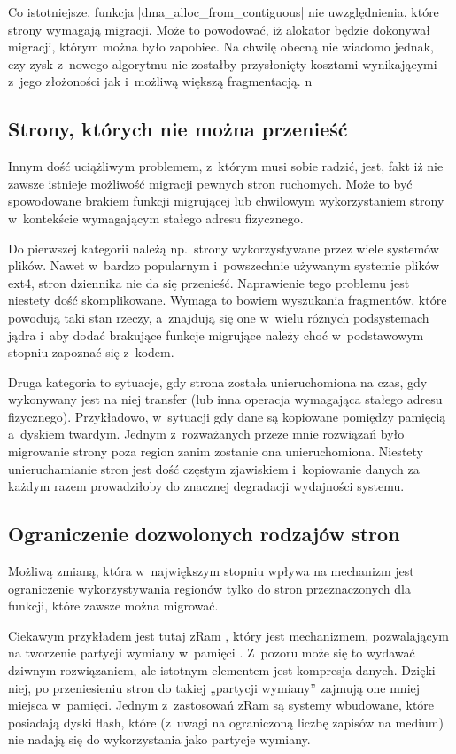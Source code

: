 Co istotniejsze, funkcja \code|dma_alloc_from_contiguous| nie
uwzględnienia, które strony wymagają migracji.  Może to powodować, iż
alokator będzie dokonywał migracji, którym można było zapobiec.  Na
chwilę obecną nie wiadomo jednak, czy zysk z~nowego algorytmu nie
zostałby przysłonięty kosztami wynikającymi z~jego złożoności jak
i~możliwą większą fragmentacją.
n
\subsection{Strony, których nie można przenieść}

Innym dość uciążliwym problemem, z~którym  musi sobie radzić, jest,
fakt iż nie zawsze istnieje możliwość migracji pewnych stron
ruchomych.  Może to być spowodowane brakiem funkcji migrującej lub
chwilowym wykorzystaniem strony w~kontekście wymagającym stałego
adresu fizycznego.

Do pierwszej kategorii należą np.\ strony wykorzystywane przez wiele
systemów plików.  Nawet w~bardzo popularnym i~powszechnie używanym
systemie plików ext4, stron dziennika nie da się przenieść.
Naprawienie tego problemu jest niestety dość skomplikowane.  Wymaga to
bowiem wyszukania fragmentów, które powodują taki stan rzeczy,
a~znajdują się one w~wielu różnych podsystemach jądra i~aby dodać
brakujące funkcje migrujące należy choć w~podstawowym stopniu zapoznać
się z~kodem.

Druga kategoria to sytuacje, gdy strona została unieruchomiona na
czas, gdy wykonywany jest na niej transfer  (lub inna operacja
wymagająca stałego adresu fizycznego).  Przykładowo, w~sytuacji gdy
dane są kopiowane pomiędzy pamięcią a~dyskiem twardym.  Jednym
z~rozważanych przeze mnie rozwiązań było migrowanie strony poza region
 zanim zostanie ona unieruchomiona.  Niestety unieruchamianie stron
jest dość częstym zjawiskiem i~kopiowanie danych za każdym razem
prowadziłoby do znacznej degradacji wydajności systemu.


\subsection{Ograniczenie dozwolonych rodzajów stron}

Możliwą zmianą, która w~największym stopniu wpływa na mechanizm 
jest ograniczenie wykorzystywania regionów  tylko do stron
przeznaczonych dla funkcji, które zawsze można migrować.

Ciekawym przykładem jest tutaj zRam \autocite{patch:zram}, który jest
mechanizmem, pozwalającym na tworzenie partycji wymiany w~pamięci .
Z~pozoru może się to wydawać dziwnym rozwiązaniem, ale istotnym
elementem jest kompresja danych.  Dzięki niej, po przeniesieniu stron
do takiej „partycji wymiany” zajmują one mniej miejsca w~pamięci.
Jednym z~zastosowań zRam są systemy wbudowane, które posiadają dyski
flash, które (z~uwagi na ograniczoną liczbę zapisów na medium) nie
nadają się do wykorzystania jako partycje wymiany.

